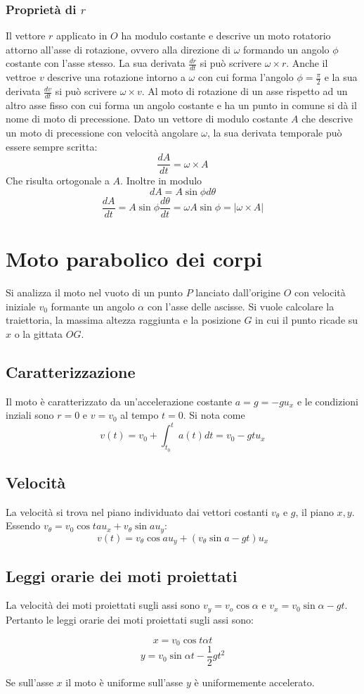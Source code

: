 \documentclass[class=book, crop=false, oneside, 12pt]{standalone}
\begin{document}
		\subsubsection{Propriet\`a di $r$}
		Il vettore $r$ applicato in $O$ ha modulo costante e descrive un moto rotatorio attorno all'asse di rotazione, ovvero alla direzione di $\omega$ formando un angolo $\phi$ costante con l'asse stesso.
		La sua derivata $\frac{dr}{dt}$ si pu\`o scrivere $\omega\times r$.
		Anche il vettroe $v$ descrive una rotazione intorno a $\omega$ con cui forma l'angolo $\phi=\frac{\pi}{2}$ e la sua derivata $\frac{dv}{dt}$ si pu\`o scrivere $\omega\times v$.
		Al moto di rotazione di un asse rispetto ad un altro asse fisso con cui forma un angolo costante e ha un punto in comune si d\`a il nome di moto di precessione.
		Dato un vettore di modulo costante $A$ che descrive un moto di precessione con velocit\`a angolare $\omega$, la sua derivata temporale pu\`o essere sempre scritta:
		$$\dfrac{dA}{dt}=\omega\times A$$
		Che risulta ortogonale a $A$.
		Inoltre in modulo
		$$dA=A\sin\phi d\theta$$
		$$\dfrac{dA}{dt}=A\sin\phi\dfrac{d\theta}{dt}=\omega A\sin\phi=|\omega\times A|$$
\section{Moto parabolico dei corpi}
Si analizza il moto nel vuoto di un punto $P$ lanciato dall'origine $O$ con velocit\`a iniziale $v_0$ formante un angolo $\alpha$ con l'asse delle ascisse.
Si vuole calcolare la traiettoria, la massima altezza raggiunta e la posizione $G$ in cui il punto ricade su $x$ o la gittata $OG$.
	\subsection{Caratterizzazione}
	Il moto \`e caratterizzato da un'accelerazione costante $a=g=-gu_x$ e le condizioni inziali sono $r=0$ e $v=v_0$ al tempo $t=0$.
	Si nota come
	$$v(t)=v_0+\int_{t_0}^ta(t)dt=v_0-gtu_x$$
	\subsection{Velocit\`a}
	La velocit\`a si trova nel piano individuato dai vettori costanti $v_\theta$ e $g$, il piano $x,y$.
	Essendo $v_\theta=v_0\cos t au_x+v_\theta\sin au_y$:
	$$v(t)=v_\theta\cos au_y+(v_\theta\sin a-gt)u_x$$
	\subsection{Leggi orarie dei moti proiettati}
	La velocit\`a dei moti proiettati sugli assi sono $v_y=v_o\cos\alpha$ e $v_x=v_0\sin\alpha-gt$.
	Pertanto le leggi orarie dei moti proiettati sugli assi sono:
  \begin{multicols}{2}
    \noindent
    $$x=v_0\cos t\alpha t$$
    $$y=v_0\sin\alpha t-\dfrac{1}{2}gt^2$$
  \end{multicols}
	Se sull'asse $x$ il moto \`e uniforme sull'asse $y$ \`e uniformemente accelerato.
\end{document}
